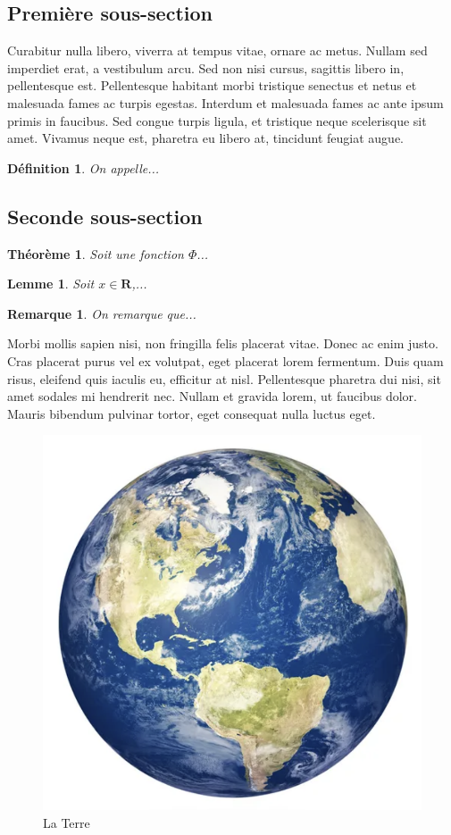 \documentclass[a4paper]{article}
\newtheorem{theorem}{Th\'eor\`eme}[subsection]
\newtheorem{definition}{D\'efinition}[subsection]
\newtheorem{lemma}{Lemme}[subsection]
\newtheorem{remark}{Remarque}[subsection]
\begin{document}
\subsection{Première sous-section}

Curabitur nulla libero, viverra at tempus vitae, ornare ac metus. Nullam sed imperdiet erat, a vestibulum arcu. Sed non nisi cursus, sagittis libero in, pellentesque est. Pellentesque habitant morbi tristique senectus et netus et malesuada fames ac turpis egestas. Interdum et malesuada fames ac ante ipsum primis in faucibus. Sed congue turpis ligula, et tristique neque scelerisque sit amet. Vivamus neque est, pharetra eu libero at, tincidunt feugiat augue.

\begin{definition}
On appelle... 
\end{definition}


\subsection{Seconde sous-section}

\begin{theorem}
Soit une fonction $\Phi$... 
\end{theorem}

\begin{lemma}
Soit $x \in \mathbf{R}$,...
\end{lemma}

\begin{remark}
On remarque que...
\end{remark}

Morbi mollis sapien nisi, non fringilla felis placerat vitae. Donec ac enim justo. Cras placerat purus vel ex volutpat, eget placerat lorem fermentum. Duis quam risus, eleifend quis iaculis eu, efficitur at nisl. Pellentesque pharetra dui nisi, sit amet sodales mi hendrerit nec. Nullam et gravida lorem, ut faucibus dolor. Mauris bibendum pulvinar tortor, eget consequat nulla luctus eget.

\begin{figure}[t]
 \begin{center}
   \includegraphics[width=0.295\linewidth]{terre.png}

 \end{center}
 \caption{La Terre}
\label{fig:fig1}
\end{figure}
\end{document}

